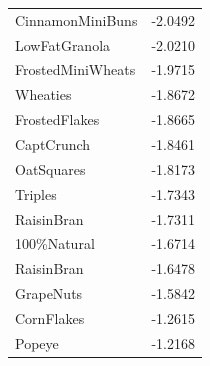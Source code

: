 \begin{table}[!htbp]
\begin{tabular}{ll}
\\
CinnamonMiniBuns & -2.0492
\\
LowFatGranola & -2.0210
\\
FrostedMiniWheats & -1.9715
\\
Wheaties & -1.8672
\\
FrostedFlakes & -1.8665
\\
CaptCrunch & -1.8461
\\
OatSquares & -1.8173
\\
Triples & -1.7343
\\
RaisinBran & -1.7311
\\
100\%Natural & -1.6714
\\
RaisinBran & -1.6478
\\
GrapeNuts & -1.5842
\\
CornFlakes & -1.2615
\\
Popeye & -1.2168
\\
\hline
\end{tabular}
\end{table}
